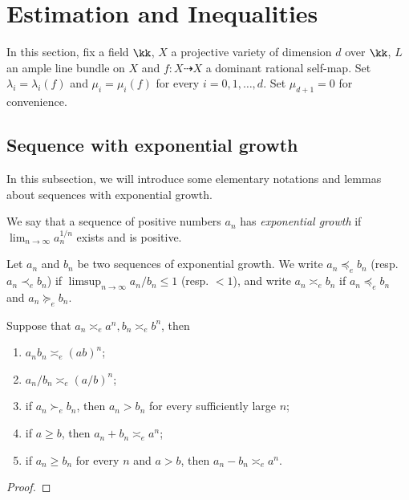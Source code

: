 \section{Estimation and Inequalities}

In this section, fix a field $\kk$, $X$ a projective variety of dimension $d$ over $\kk$, $L$ an ample line bundle on $X$ and $f : X \dashrightarrow X$ a dominant rational self-map.
Set $\lambda_i = \lambda_i(f)$ and $\mu_i = \mu_i(f)$ for every $i = 0, 1, \ldots, d$.
Set $\mu_{d+1} = 0$ for convenience.


\subsection{Sequence with exponential growth}

In this subsection, we will introduce some elementary notations and lemmas about sequences with exponential growth.

\begin{definition}
	We say that a sequence of positive numbers $a_n$ has \emph{exponential growth} if $\lim_{n \to \infty} a_n^{1/n}$ exists and is positive.
\end{definition}

\begin{definition}
	Let $a_n$ and $b_n$ be two sequences of exponential growth.
	We write $a_n \preccurlyeq_e b_n$ (resp. $a_n \prec_e b_n$) if $\limsup_{n \to \infty} a_n/b_n \leq 1$ (resp. $<1$), and write $a_n \asymp_e b_n$ if $a_n \preccurlyeq_e b_n$ and $a_n \succcurlyeq_e b_n$.
\end{definition}


\begin{lemma}\label{lemma:elementary_inequalities}
	Suppose that $a_n \asymp_e a^n, b_n \asymp_e b^n$, then
	\begin{enumerate}
		\item $a_n b_n \asymp_e (ab)^n$;
		\item $a_n/b_n \asymp_e (a/b)^n$;
		\item if $a_n \succ_e b_n$, then $a_n > b_n$ for every sufficiently large $n$;
		\item if $a \geq b$, then $a_n + b_n \asymp_e a^n$;
		\item if $a_n \geq b_n$ for every $n$ and $a > b$, then $a_n - b_n \asymp_e a^n$.
	\end{enumerate}
\end{lemma}
\begin{proof}

\end{proof}


